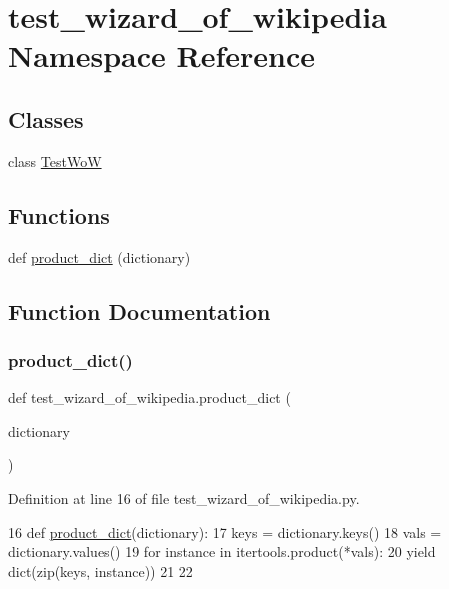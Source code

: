 \hypertarget{namespacetest__wizard__of__wikipedia}{}\section{test\+\_\+wizard\+\_\+of\+\_\+wikipedia Namespace Reference}
\label{namespacetest__wizard__of__wikipedia}
\subsection*{Classes}
\begin{DoxyCompactItemize}
\item 
class \hyperlink{classtest__wizard__of__wikipedia_1_1TestWoW}{Test\+WoW}
\end{DoxyCompactItemize}
\subsection*{Functions}
\begin{DoxyCompactItemize}
\item 
def \hyperlink{namespacetest__wizard__of__wikipedia_a164c55752f617c13303f14f70ac90b0c}{product\+\_\+dict} (dictionary)
\end{DoxyCompactItemize}


\subsection{Function Documentation}
\mbox{\label{namespacetest__wizard__of__wikipedia_a164c55752f617c13303f14f70ac90b0c}} 
\subsubsection{\texorpdfstring{product\+\_\+dict()}{product\_dict()}}
{\footnotesize\ttfamily def test\+\_\+wizard\+\_\+of\+\_\+wikipedia.\+product\+\_\+dict (\begin{DoxyParamCaption}\item[{}]{dictionary }\end{DoxyParamCaption})}



Definition at line 16 of file test\+\_\+wizard\+\_\+of\+\_\+wikipedia.\+py.


\begin{DoxyCode}
16 \textcolor{keyword}{def }\hyperlink{namespacetest__wizard__of__wikipedia_a164c55752f617c13303f14f70ac90b0c}{product\_dict}(dictionary):
17     keys = dictionary.keys()
18     vals = dictionary.values()
19     \textcolor{keywordflow}{for} instance \textcolor{keywordflow}{in} itertools.product(*vals):
20         \textcolor{keywordflow}{yield} dict(zip(keys, instance))
21 
22 
\end{DoxyCode}
